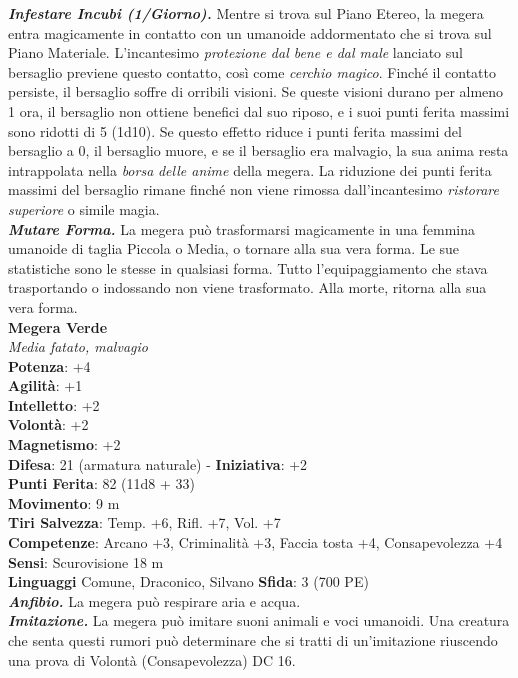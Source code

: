 \begin{multicols}{2}
\emph{\textbf{Infestare Incubi (1/Giorno).}} Mentre si trova sul Piano Etereo, la megera entra magicamente in contatto con un umanoide addormentato che si trova sul Piano Materiale. L'incantesimo \emph{protezione dal bene e dal male} lanciato sul bersaglio previene questo contatto, così come \emph{cerchio magico}. Finché il contatto persiste, il bersaglio soffre di orribili visioni. Se queste visioni durano per almeno 1 ora, il bersaglio non ottiene benefici dal suo riposo, e i suoi punti ferita massimi sono ridotti di 5 (1d10). Se questo effetto riduce i punti ferita massimi del bersaglio a 0, il bersaglio muore, e se il bersaglio era malvagio, la sua anima resta intrappolata nella \emph{borsa} \emph{delle anime} della megera. La riduzione dei punti ferita massimi del bersaglio rimane finché non viene rimossa dall'incantesimo \emph{ristorare} \emph{superiore} o simile magia.\\

\emph{\textbf{Mutare Forma.}} La megera può trasformarsi magicamente in una femmina umanoide di taglia Piccola o Media, o tornare alla sua vera forma. Le sue statistiche sono le stesse in qualsiasi forma. Tutto l'equipaggiamento che stava trasportando o indossando non viene trasformato. Alla morte, ritorna alla sua vera forma.\\

\medskip\textbf{Megera Verde}\\
\emph{Media fatato, malvagio}\\
\textbf{Potenza}: +4\\
\textbf{Agilità}: +1\\
\textbf{Intelletto}: +2\\
\textbf{Volontà}: +2\\
\textbf{Magnetismo}: +2\\
\textbf{Difesa}: 21 (armatura naturale) - \textbf{Iniziativa}: +2\\
\textbf{Punti Ferita}: 82 (11d8 + 33)\\
\textbf{Movimento}: 9 m\\
\textbf{Tiri Salvezza}: Temp. +6, Rifl. +7, Vol. +7\\
\textbf{Competenze}: Arcano +3, Criminalità +3, Faccia tosta +4, Consapevolezza +4\\
\textbf{Sensi}: Scurovisione 18 m\\
\textbf{Linguaggi} Comune, Draconico, Silvano
\textbf{Sfida}: 3 (700 PE)\smallskip\\
\emph{\textbf{Anfibio.}} La megera può respirare aria e acqua.\\
\emph{\textbf{Imitazione.}} La megera può imitare suoni animali e voci umanoidi. Una creatura che senta questi rumori può determinare che si tratti di un'imitazione riuscendo una prova di Volontà (Consapevolezza) DC  16.\\


\end{multicols}
